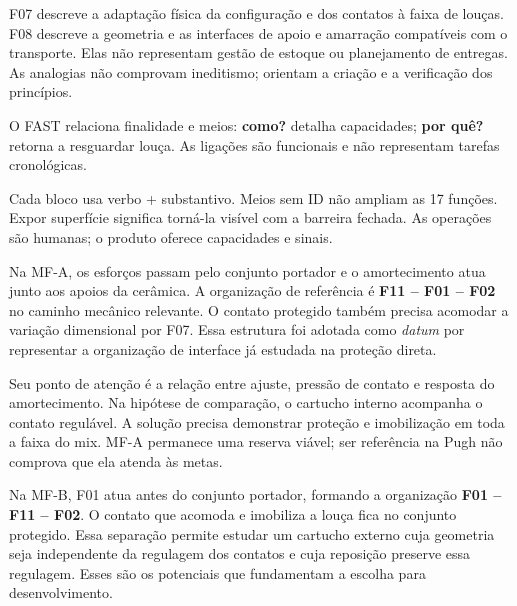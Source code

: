 F07 descreve a adaptação física da configuração e dos contatos à faixa de louças. F08 descreve a geometria e as interfaces de apoio e amarração compatíveis com o transporte. Elas não representam gestão de estoque ou planejamento de entregas. As analogias não comprovam ineditismo; orientam a criação e a verificação dos princípios.


O FAST relaciona finalidade e meios: \textbf{como?} detalha capacidades; \textbf{por quê?} retorna a resguardar louça. As ligações são funcionais e não representam tarefas cronológicas.


Cada bloco usa verbo + substantivo. Meios sem ID não ampliam as 17 funções. Expor superfície significa torná-la visível com a barreira fechada. As operações são humanas; o produto oferece capacidades e sinais.



Na MF-A, os esforços passam pelo conjunto portador e o amortecimento atua junto aos apoios da cerâmica. A organização de referência é \textbf{F11 -- F01 -- F02} no caminho mecânico relevante. O contato protegido também precisa acomodar a variação dimensional por F07. Essa estrutura foi adotada como \textit{datum} por representar a organização de interface já estudada na proteção direta.

Seu ponto de atenção é a relação entre ajuste, pressão de contato e resposta do amortecimento. Na hipótese de comparação, o cartucho interno acompanha o contato regulável. A solução precisa demonstrar proteção e imobilização em toda a faixa do mix. MF-A permanece uma reserva viável; ser referência na Pugh não comprova que ela atenda às metas.



Na MF-B, F01 atua antes do conjunto portador, formando a organização \textbf{F01 -- F11 -- F02}. O contato que acomoda e imobiliza a louça fica no conjunto protegido. Essa separação permite estudar um cartucho externo cuja geometria seja independente da regulagem dos contatos e cuja reposição preserve essa regulagem. Esses são os potenciais que fundamentam a escolha para desenvolvimento.

